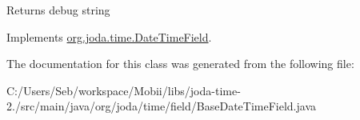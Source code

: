 \begin{DoxyReturn}{Returns}
debug string 
\end{DoxyReturn}


Implements \hyperlink{classorg_1_1joda_1_1time_1_1_date_time_field_a9d888721d7214b6953f3bb3cc4fa5583}{org.\-joda.\-time.\-Date\-Time\-Field}.



The documentation for this class was generated from the following file\-:\begin{DoxyCompactItemize}
\item 
C\-:/\-Users/\-Seb/workspace/\-Mobii/libs/joda-\/time-\/2./src/main/java/org/joda/time/field/Base\-Date\-Time\-Field.\-java\end{DoxyCompactItemize}
